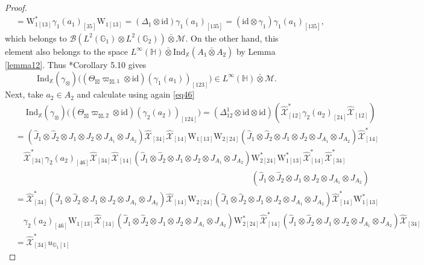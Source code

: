 \documentclass[reqno]{amsart}
\numberwithin{equation}{section}
\newcommand{\id}{\mathrm{id}}
\newcommand{\G}{\mathbb{G}}
\newcommand{\X}{\mathbb{X}}
\newcommand{\Ind}{\mathrm{Ind}}
\newcommand{\mc}{\mathcal}
\newcommand{\wh}{\widehat}
\newcommand{\HH}{\mathbb{H}}
\newcommand{\GG}{\mathbb{G}}
\newcommand{\ww}{\mathrm{W}}
\begin{document}
\begin{proof}
\begin{equation}
\begin{split}
&=
\ww_{1 [13]}^*  \gamma_1(a_1)_{[35]}\ww_{1[13]}=
(\Delta_1\otimes\id)\gamma_1(a_1)_{[135]}=
(\id\otimes\gamma_1)\gamma_1(a_1)_{[135]},
\end{split}\end{equation}
which belongs to $\mc{B}(L^2(\GG_1)\otimes L^2(\GG_2))\bar\otimes \mc{M}$. On the other hand, this element also belongs to the space $L^{\infty}(\HH)\bar\otimes \Ind_{\X}(A_1\bar\otimes A_2)$ by Lemma \ref{lemma12}. Thus \cite{Tak02}*{Corollary 5.10} gives
\[
\Ind_{\X}(\gamma_\otimes )\bigl(
 (\Theta_{\boxtimes}\varpi_{\boxtimes,1}\otimes \id)(\gamma_1(a_1))_{[123]}
\bigr)\in 
L^{\infty}(\HH)\bar\otimes \mc{M}.
\]
Next, take $a_2\in A_2$ and calculate using again \eqref{eq46}
\begin{equation}\begin{split}\label{eq55}
&\quad\;
\Ind_{\X}(\gamma_\otimes )\bigl(
 (\Theta_{\boxtimes}\varpi_{\boxtimes,2}\otimes \id)(\gamma_2(a_2))_{[124]}
\bigr)=
(\Delta_{12}^1\otimes\id\otimes\id)(\wh{\mc{X}}^*_{[12]} \gamma_2(a_2)_{[24]}
\wh{\mc{X}}_{[12]})\\
&=
(\hat{J}_1\otimes \hat{J}_2\otimes 
J_1\otimes J_2\otimes J_{A_1}\otimes J_{A_2})
\wh{\mc{X}}_{[34]}\wh{\mc{X}}_{[14]} \ww_{1[13]}\ww_{2[24]}
(\hat{J}_1\otimes \hat{J}_2\otimes 
J_1\otimes J_2\otimes J_{A_1}\otimes J_{A_2})
\wh{\mc{X}}_{[14]}^*\\
&\quad
\wh{\mc{X}}^*_{[34]}
\gamma_2(a_2)_{[46]}
\wh{\mc{X}}_{[34]}
\wh{\mc{X}}_{[14]}
(\hat{J}_1\otimes \hat{J}_2\otimes 
J_1\otimes J_2\otimes J_{A_1}\otimes J_{A_2})
\ww_{2[24]}^*
\ww_{1[13]}^*
\wh{\mc{X}}_{[14]}^*
\wh{\mc{X}}_{[34]}^*\\
&\quad\quad\quad\quad\quad\quad\quad\quad
\quad\quad\quad\quad\quad\quad\quad\quad
\quad\quad\quad\quad\quad\quad\quad\quad
\quad\quad\quad\quad
(\hat{J}_1\otimes \hat{J}_2\otimes 
J_1\otimes J_2\otimes J_{A_1}\otimes J_{A_2})\\
&=
\wh{\mc{X}}_{[34]}^*
(\hat{J}_1\otimes \hat{J}_2\otimes 
J_1\otimes J_2\otimes J_{A_1}\otimes J_{A_2})
\wh{\mc{X}}_{[14]} \ww_{2[24]}
(\hat{J}_1\otimes \hat{J}_2\otimes 
J_1\otimes J_2\otimes J_{A_1}\otimes J_{A_2})
\wh{\mc{X}}_{[14]}^*\ww_{1[13]}^*\\
&\quad
\gamma_2(a_2)_{[46]}
\ww_{1[13]}
\wh{\mc{X}}_{[14]}
(\hat{J}_1\otimes \hat{J}_2\otimes 
J_1\otimes J_2\otimes J_{A_1}\otimes J_{A_2})
\ww_{2[24]}^*
\wh{\mc{X}}_{[14]}^*
(\hat{J}_1\otimes \hat{J}_2\otimes 
J_1\otimes J_2\otimes J_{A_1}\otimes J_{A_2})
\wh{\mc{X}}_{[34]}\\
&=
\wh{\mc{X}}_{[34]}^*
u_{\G_1 [1]}

\end{split}
\end{equation}
\end{proof}
\end{document}

